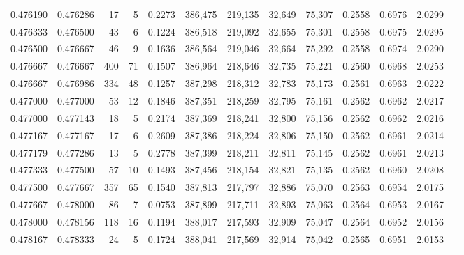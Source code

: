 \begin{tabular}{rrrrrrrrrrrrr}
0.476190 & 0.476286 &    17 &   5 &                                     0.2273 & 386,475 & 219,135 &  32,649 &  75,307 & 0.2558 & 0.6976 & 2.0299 \\
0.476333 & 0.476500 &    43 &   6 &                                     0.1224 & 386,518 & 219,092 &  32,655 &  75,301 & 0.2558 & 0.6975 & 2.0295 \\
0.476500 & 0.476667 &    46 &   9 &                                     0.1636 & 386,564 & 219,046 &  32,664 &  75,292 & 0.2558 & 0.6974 & 2.0290 \\
0.476667 & 0.476667 &   400 &  71 &                                     0.1507 & 386,964 & 218,646 &  32,735 &  75,221 & 0.2560 & 0.6968 & 2.0253 \\
0.476667 & 0.476986 &   334 &  48 &                                     0.1257 & 387,298 & 218,312 &  32,783 &  75,173 & 0.2561 & 0.6963 & 2.0222 \\
0.477000 & 0.477000 &    53 &  12 &                                     0.1846 & 387,351 & 218,259 &  32,795 &  75,161 & 0.2562 & 0.6962 & 2.0217 \\
0.477000 & 0.477143 &    18 &   5 &                                     0.2174 & 387,369 & 218,241 &  32,800 &  75,156 & 0.2562 & 0.6962 & 2.0216 \\
0.477167 & 0.477167 &    17 &   6 &                                     0.2609 & 387,386 & 218,224 &  32,806 &  75,150 & 0.2562 & 0.6961 & 2.0214 \\
0.477179 & 0.477286 &    13 &   5 &                                     0.2778 & 387,399 & 218,211 &  32,811 &  75,145 & 0.2562 & 0.6961 & 2.0213 \\
0.477333 & 0.477500 &    57 &  10 &                                     0.1493 & 387,456 & 218,154 &  32,821 &  75,135 & 0.2562 & 0.6960 & 2.0208 \\
0.477500 & 0.477667 &   357 &  65 &                                     0.1540 & 387,813 & 217,797 &  32,886 &  75,070 & 0.2563 & 0.6954 & 2.0175 \\
0.477667 & 0.478000 &    86 &   7 &                                     0.0753 & 387,899 & 217,711 &  32,893 &  75,063 & 0.2564 & 0.6953 & 2.0167 \\
0.478000 & 0.478156 &   118 &  16 &                                     0.1194 & 388,017 & 217,593 &  32,909 &  75,047 & 0.2564 & 0.6952 & 2.0156 \\
0.478167 & 0.478333 &    24 &   5 &                                     0.1724 & 388,041 & 217,569 &  32,914 &  75,042 & 0.2565 & 0.6951 & 2.0153 \\

\end{tabular}
